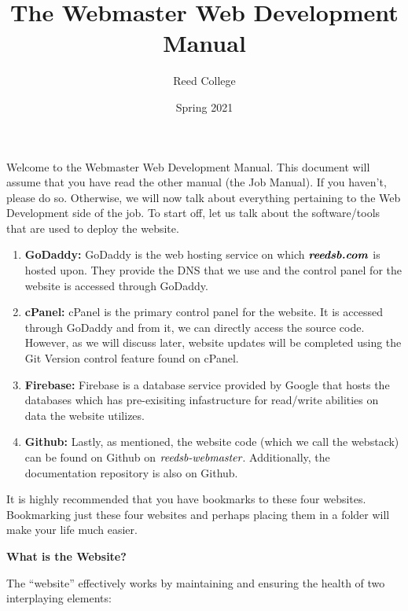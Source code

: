 \documentclass[a4paper]{article}
\title{The Webmaster Web Development Manual}
\author{Reed College}
\date{Spring 2021}
\begin{document}
\maketitle

Welcome to the Webmaster Web Development Manual. This document will assume that you have read the other manual (the Job Manual). If you haven't, please do so. Otherwise, we will now talk about everything pertaining to the Web Development side of the job. To start off, let us talk about the software/tools that are used to deploy the website.


\begin{enumerate}
  \item \textbf{GoDaddy:} GoDaddy is the web hosting service on which $\textbf{\textit{reedsb.com}}$ is hosted upon. They provide the DNS that we use and the control panel for the website is accessed through GoDaddy.
  \item \textbf{cPanel:} cPanel is the primary control panel for the website. It is accessed through GoDaddy and from it, we can directly access the source code. However, as we will discuss later, website updates will be completed using the Git Version control feature found on cPanel.
  \item \textbf{Firebase:} Firebase is a database service provided by Google that hosts the databases which has pre-exisiting infastructure for read/write abilities on data the website utilizes.
  \item \textbf{Github:} Lastly, as mentioned, the website code (which we call the webstack) can be found on Github on $\textit{reedsb-webmaster}$. Additionally, the documentation repository is also on Github.
\end{enumerate}

It is highly recommended that you have bookmarks to these four websites. Bookmarking just these four websites and perhaps placing them in a folder will make your life much easier.

%

\begin{center}
\textbf{What is the Website?}
\end{center}
The ``website'' effectively works by maintaining and ensuring the health of two interplaying elements:
\end{document}
